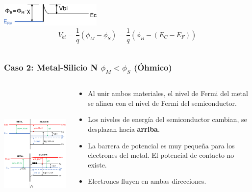\documentclass[10pt,t,aspectratio=169]{beamer}
\begin{document}
\begin{frame}[t]
\begin{columns}
\begin{column}{0.5\textwidth}
            \vspace{5mm}
            \centering
            \includegraphics[width=5cm]{./figures/contactos-caso1b.pdf}
            \[ V_{bi} = \dfrac{1}{q}(\phi_M - \phi_S) = \dfrac{1}{q}(\phi_B - (E_C - E_F)) \]
            
        \end{column}

    \end{columns}
    
\end{frame}



\begin{frame}[t]
    \frametitle{Caso 2:	Metal-Silicio N \hspace{1cm} $\phi_M<\phi_S$ \hspace{1cm} (Óhmico)}

    \begin{columns}
    
        \begin{column}{0.5\textwidth}
        
            \centering
            \includegraphics[height=7cm]{./figures/contactos-caso2.pdf}
            
        \end{column}
        
        \begin{column}{0.5\textwidth}
        
            \begin{itemize}
                \item Al unir ambos materiales, el nivel de Fermi del metal se alinea con el nivel de Fermi del semiconductor.
                \item Los niveles de energía del semiconductor cambian, se desplazan hacia \textbf{arriba}.
                \item La barrera de potencial es muy pequeña para los electrones del metal. El potencial de contacto no existe.
                \item Electrones fluyen en ambas direcciones.
            \end{itemize}


\end{column}
\end{columns}
\end{frame}
\end{document}
